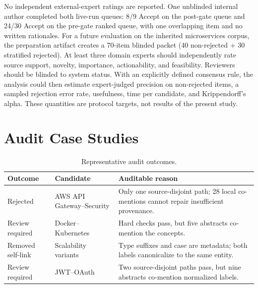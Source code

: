 \documentclass[conference, onecolumn]{IEEEtran}
\begin{document}
No independent external-expert ratings are reported. One unblinded internal author completed both live-run queues: 8/9 Accept on the post-gate queue and 24/30 Accept on the pre-gate ranked queue, with one overlapping item and no written rationales. For a future evaluation on the inherited microservices corpus, the preparation artifact creates a 70-item blinded packet (40 non-rejected + 30 stratified rejected). At least three domain experts should independently rate source support, novelty, importance, actionability, and feasibility. Reviewers should be blinded to system status. With an explicitly defined consensus rule, the analysis could then estimate expert-judged precision on non-rejected items, a sampled rejection error rate, usefulness, time per candidate, and Krippendorff's alpha. These quantities are protocol targets, not results of the present study.

\section{Audit Case Studies}
\label{app:cases}

\begin{table}[h]
\caption{Representative audit outcomes.}
\label{tab:cases}
\centering
\begin{tabular}{L{2.3cm}L{4.0cm}L{5.0cm}}
\toprule
Outcome & Candidate & Auditable reason\\
\midrule
Rejected & AWS API Gateway--Security & Only one source-disjoint path; 28 local co-mentions cannot repair insufficient provenance.\\
Review required & Docker--Kubernetes & Hard checks pass, but five abstracts co-mention the concepts.\\
Removed self-link & Scalability variants & Type suffixes and case are metadata; both labels canonicalize to the same entity.\\
Review required & JWT--OAuth & Two source-disjoint paths pass, but nine abstracts co-mention normalized labels.\\
\bottomrule
\end{tabular}
\end{table}
\end{document}
